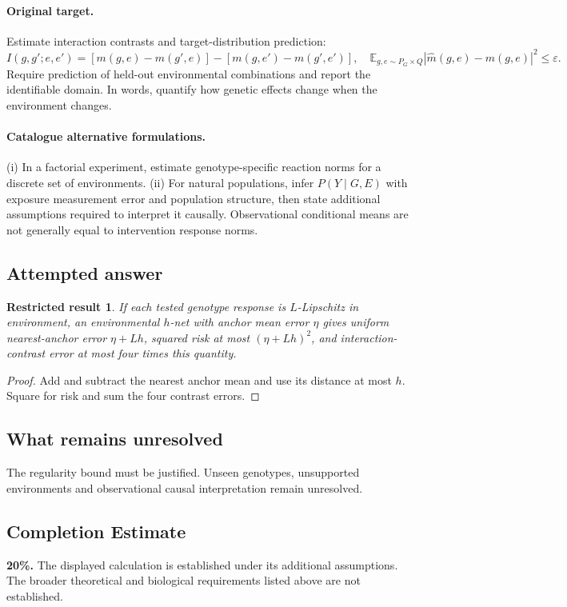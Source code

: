 \documentclass[11pt]{article}
\newcommand{\E}{\mathbb E}
\providecommand{\E}{\mathbb E}
\newtheorem{attemptresult}{Restricted result}[section]
\begin{document}
\paragraph{Original target.}
Estimate interaction contrasts and target-distribution prediction:
\[
I(g,g';e,e')=[m(g,e)-m(g',e)]-[m(g,e')-m(g',e')],
\quad \E_{g,e\sim P_G\times Q}|\widehat m(g,e)-m(g,e)|^2\leq\varepsilon.
\]
Require prediction of held-out environmental combinations and report the identifiable domain. In words, quantify how genetic effects change when the environment changes.
\paragraph{Catalogue alternative formulations.}
(i) In a factorial experiment, estimate genotype-specific reaction norms for a discrete set of environments. (ii) For natural populations, infer $P(Y\mid G,E)$ with exposure measurement error and population structure, then state additional assumptions required to interpret it causally. Observational conditional means are not generally equal to intervention response norms.
\subsection{Attempted answer}
\begin{attemptresult}
If each tested genotype response is $L$-Lipschitz in environment, an environmental $h$-net with anchor mean error $\eta$ gives uniform nearest-anchor error $\eta+Lh$, squared risk at most $(\eta+Lh)^2$, and interaction-contrast error at most four times this quantity.
\end{attemptresult}
\begin{proof}
Add and subtract the nearest anchor mean and use its distance at most $h$. Square for risk and sum the four contrast errors.
\end{proof}
\subsection{What remains unresolved}
The regularity bound must be justified. Unseen genotypes, unsupported environments and observational causal interpretation remain unresolved.
\subsection{Completion Estimate}
\textbf{20\%.} The displayed calculation is established under its additional assumptions. The broader theoretical and biological requirements listed above are not established.
\end{document}

